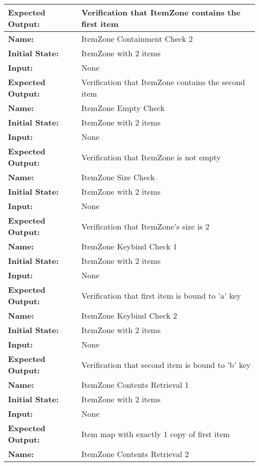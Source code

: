 \documentclass[12pt, titlepage]{article}
\begin{document}
\begin{center}
\begin{longtable}{ l | p{10cm} }
				\textbf{Expected Output:} & Verification that ItemZone contains the first item\\[0.6em]
				\hline
				\rule{0pt}{1.5em}\textbf{Name:} & ItemZone Containment Check 2\\
				\textbf{Initial State:} & ItemZone with 2 items\\
				\textbf{Input:} & None\\
				\textbf{Expected Output:} & Verification that ItemZone contains the second item\\[0.6em]
				\hline
				\rule{0pt}{1.5em}\textbf{Name:} & ItemZone Empty Check\\
				\textbf{Initial State:} & ItemZone with 2 items\\
				\textbf{Input:} & None\\
				\textbf{Expected Output:} & Verification that ItemZone is not empty\\[0.6em]
				\hline
				\rule{0pt}{1.5em}\textbf{Name:} & ItemZone Size Check\\
				\textbf{Initial State:} & ItemZone with 2 items\\
				\textbf{Input:} & None\\
				\textbf{Expected Output:} & Verification that ItemZone's size is 2\\[0.6em]
				\hline
				\rule{0pt}{1.5em}\textbf{Name:} & ItemZone Keybind Check 1\\
				\textbf{Initial State:} & ItemZone with 2 items\\
				\textbf{Input:} & None\\
				\textbf{Expected Output:} & Verification that first item is bound to 'a' key\\[0.6em]
				\hline
				\rule{0pt}{1.5em}\textbf{Name:} & ItemZone Keybind Check 2\\
				\textbf{Initial State:} & ItemZone with 2 items\\
				\textbf{Input:} & None\\
				\textbf{Expected Output:} & Verification that second item is bound to 'b' key\\[0.6em]
				\hline
				\rule{0pt}{1.5em}\textbf{Name:} & ItemZone Contents Retrieval 1\\
				\textbf{Initial State:} & ItemZone with 2 items\\
				\textbf{Input:} & None\\
				\textbf{Expected Output:} & Item map with exactly 1 copy of first item\\[0.6em]
				\hline
				\rule{0pt}{1.5em}\textbf{Name:} & ItemZone Contents Retrieval 2\\

\end{longtable}
\end{center}
\end{document}
